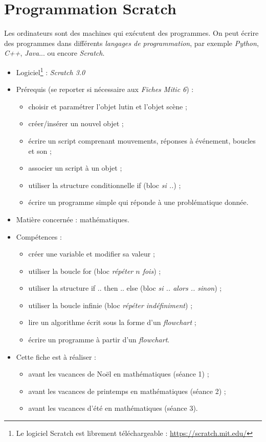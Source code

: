 \chapter{Programmation Scratch}  


Les ordinateurs sont des machines qui exécutent des programmes. On peut écrire des programmes dans différents \emph{langages de programmation}, par exemple \emph{Python}, \emph{C++}, \emph{Java}... ou encore \emph{Scratch}.



{\footnotesize
\begin{itemize}
\item Logiciel\footnote{Le logiciel Scratch est librement téléchargeable : \url{https://scratch.mit.edu/}} : \emph{Scratch 3.0}
\item Prérequis (se reporter si nécessaire aux \emph{Fiches Mitic 6}) : 
        \begin{itemize}
        \item choisir et paramétrer l'objet lutin et l'objet scène ;
        \item créer/insérer un nouvel objet ; 
        \item écrire un script comprenant mouvements, réponses à événement, boucles et son ;
        \item associer un script à un objet ;
        \item utiliser la structure conditionnelle if (bloc \emph{si ..}) ; 
        \item écrire un programme simple qui réponde à une problématique donnée.
        \end{itemize}
\item Matière concernée : mathématiques.
\item Compétences : 
        \begin{itemize}
        \item créer une variable et modifier sa valeur ;
        \item utiliser la boucle for (bloc \emph{répéter $n$ fois}) ;
        \item utiliser la structure if .. then .. else (bloc \emph{si .. alors .. sinon}) ; 
        \item utiliser la boucle infinie (bloc \emph{répéter indéfiniment}) ;
        \item lire un algorithme écrit sous la forme d'un \emph{flowchart} ;
        \item écrire un programme à partir d'un \emph{flowchart}.
        \end{itemize}
\item Cette fiche est à réaliser :
        \begin{itemize}
        \item avant les vacances de Noël en mathématiques (séance 1) ;
        \item avant les vacances de printemps en mathématiques (séance 2) ;
        \item avant les vacances d'été en mathématiques (séance 3). 
        \end{itemize}
\end{itemize}
} %


